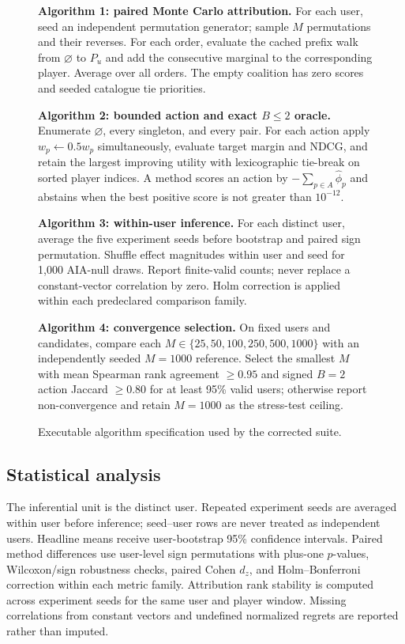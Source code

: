 \documentclass[pdflatex,sn-basic]{sn-jnl}
\begin{document}
\begin{figure}[t]
\small
\begin{minipage}{0.97\linewidth}
\textbf{Algorithm 1: paired Monte Carlo attribution.} For each user, seed an independent permutation generator; sample $M$ permutations and their reverses. For each order, evaluate the cached prefix walk from $\varnothing$ to $P_u$ and add the consecutive marginal to the corresponding player. Average over all orders. The empty coalition has zero scores and seeded catalogue tie priorities.\par\medskip
\textbf{Algorithm 2: bounded action and exact $B\le2$ oracle.} Enumerate $\varnothing$, every singleton, and every pair. For each action apply $w_p\leftarrow0.5w_p$ simultaneously, evaluate target margin and NDCG, and retain the largest improving utility with lexicographic tie-break on sorted player indices. A method scores an action by $-\sum_{p\in A}\hat\phi_p$ and abstains when the best positive score is not greater than $10^{-12}$.\par\medskip
\textbf{Algorithm 3: within-user inference.} For each distinct user, average the five experiment seeds before bootstrap and paired sign permutation. Shuffle effect magnitudes within user and seed for 1,000 AIA-null draws. Report finite-valid counts; never replace a constant-vector correlation by zero. Holm correction is applied within each predeclared comparison family.\par\medskip
\textbf{Algorithm 4: convergence selection.} On fixed users and candidates, compare each $M\in\{25,50,100,250,500,1000\}$ with an independently seeded $M=1000$ reference. Select the smallest $M$ with mean Spearman rank agreement $\ge0.95$ and signed $B=2$ action Jaccard $\ge0.80$ for at least 95\% valid users; otherwise report non-convergence and retain $M=1000$ as the stress-test ceiling.
\end{minipage}
\caption{Executable algorithm specification used by the corrected suite.}
\label{fig:algorithms}
\end{figure}

\subsection{Statistical analysis}
The inferential unit is the distinct user. Repeated experiment seeds are averaged within user before inference; seed--user rows are never treated as independent users. Headline means receive user-bootstrap 95\% confidence intervals. Paired method differences use user-level sign permutations with plus-one $p$-values, Wilcoxon/sign robustness checks, paired Cohen $d_z$, and Holm--Bonferroni correction within each metric family. Attribution rank stability is computed across experiment seeds for the same user and player window. Missing correlations from constant vectors and undefined normalized regrets are reported rather than imputed.
\end{document}
